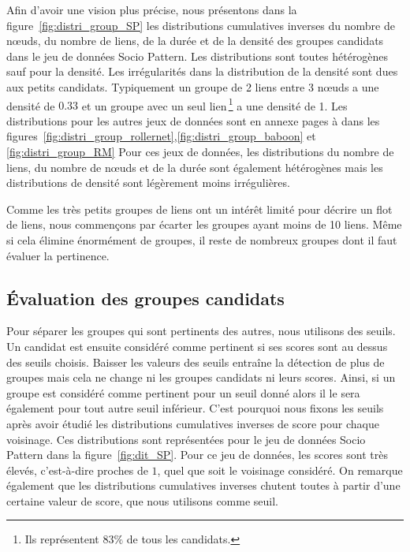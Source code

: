Afin d'avoir une vision plus précise, nous présentons dans la figure~\ref{fig:distri_group_SP} les distributions cumulatives inverses du nombre de n\oe{}uds, du nombre de liens, de la durée et de la densité des groupes candidats dans le jeu de données Socio Pattern.
Les distributions sont toutes hétérogènes sauf pour la densité.
Les irrégularités dans la distribution de la densité sont dues aux petits candidats. Typiquement un groupe de 2 liens entre 3 n\oe{}uds a une densité de $0.33$ et un groupe avec un seul lien\,\footnote{Ils représentent $83\%$ de tous les candidats.} a une densité de 1.
Les distributions pour les autres jeux de données sont en annexe pages \pageref{fig:distri_group_rollernet} à \pageref{fig:distri_group_RM} dans les figures~\ref{fig:distri_group_rollernet},\ref{fig:distri_group_baboon} et \ref{fig:distri_group_RM}
Pour ces jeux de données, les distributions du nombre de liens, du nombre de n\oe{}uds et de la durée sont également hétérogènes mais les distributions de densité sont légèrement moins irrégulières.


Comme les très petits groupes de liens ont un intérêt limité pour décrire un flot de liens, nous commençons par écarter les groupes ayant moins de 10 liens.
Même si cela élimine énormément de groupes, il reste de nombreux groupes dont il faut évaluer la pertinence.




\subsection{Évaluation des groupes candidats}

Pour séparer les groupes qui sont pertinents des autres, nous utilisons des seuils.
Un candidat est ensuite considéré comme pertinent si ses scores sont au dessus des seuils choisis.
Baisser les valeurs des seuils entraîne la détection de plus de groupes mais cela ne change ni les groupes candidats ni leurs scores.
Ainsi, si un groupe est considéré comme pertinent pour un seuil donné alors il le sera également pour tout autre seuil inférieur.
C'est pourquoi nous fixons les seuils après avoir étudié les distributions cumulatives inverses de score pour chaque voisinage.
Ces distributions sont représentées pour le jeu de données Socio Pattern dans la figure~\ref{fig:dit_SP}.
Pour ce jeu de données, les scores sont très élevés, c'est-à-dire proches de $1$, quel que soit le voisinage considéré.
On remarque également que les distributions cumulatives inverses chutent toutes à partir d'une certaine valeur de score, que nous utilisons comme seuil.

